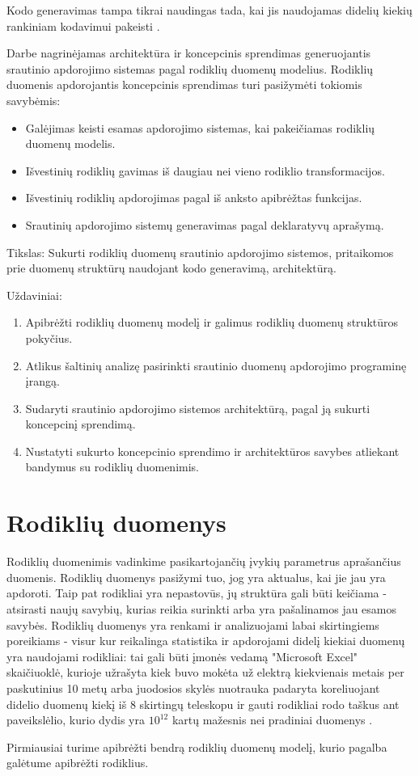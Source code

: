\documentclass{VUMIFPSbakalaurinis}
\begin{document}
Kodo generavimas tampa tikrai naudingas tada, kai jis naudojamas didelių kiekių rankiniam kodavimui pakeisti \cite{herrington2003code}. \par
Darbe nagrinėjamas architektūra ir koncepcinis sprendimas generuojantis srautinio apdorojimo sistemas pagal rodiklių duomenų modelius. Rodiklių duomenis apdorojantis koncepcinis sprendimas turi pasižymėti tokiomis savybėmis: 
\begin{itemize}
    \item Galėjimas keisti esamas apdorojimo sistemas, kai pakeičiamas rodiklių duomenų modelis.
    \item Išvestinių rodiklių gavimas iš daugiau nei vieno rodiklio transformacijos.
    \item Išvestinių rodiklių apdorojimas pagal iš anksto apibrėžtas funkcijas.
    \item Srautinių apdorojimo sistemų generavimas pagal deklaratyvų aprašymą.
\end{itemize}  

Tikslas: Sukurti rodiklių duomenų srautinio apdorojimo sistemos, pritaikomos prie duomenų struktūrų naudojant kodo generavimą, architektūrą.

Uždaviniai:
\begin{enumerate}
    \item Apibrėžti rodiklių duomenų modelį ir galimus rodiklių duomenų struktūros pokyčius.
    \item Atlikus šaltinių analizę pasirinkti srautinio duomenų apdorojimo programinę įrangą.
    \item Sudaryti srautinio apdorojimo sistemos architektūrą, pagal ją sukurti koncepcinį sprendimą. 
    \item Nustatyti sukurto koncepcinio sprendimo ir architektūros savybes atliekant bandymus su rodiklių duomenimis.
\end{enumerate}

\section{Rodiklių duomenys}

Rodiklių duomenimis vadinkime pasikartojančių įvykių parametrus aprašančius duomenis. Rodiklių duomenys pasižymi tuo, jog yra aktualus, kai jie jau yra apdoroti. Taip pat rodikliai yra nepastovūs, jų struktūra gali būti keičiama - atsirasti naujų savybių, kurias reikia surinkti arba yra pašalinamos jau esamos savybės. Rodiklių duomenys yra renkami ir analizuojami labai skirtingiems poreikiams - visur kur reikalinga statistika ir apdorojami didelį kiekiai duomenų yra naudojami rodikliai: tai gali būti įmonės vedamą "Microsoft Excel" skaičiuoklė, kurioje užrašyta kiek buvo mokėta už elektrą kiekvienais metais per paskutinius 10 metų arba juodosios skylės nuotrauka padaryta koreliuojant didelio duomenų kiekį iš 8 skirtingų teleskopu ir gauti rodikliai rodo taškus ant paveikslėlio, kurio dydis yra \(10^{12}\) kartų mažesnis nei pradiniai duomenys \cite{akiyama2019first}. \par    
Pirmiausiai turime apibrėžti bendrą rodiklių duomenų modelį, kurio pagalba galėtume apibrėžti rodiklius. 
\end{document}
